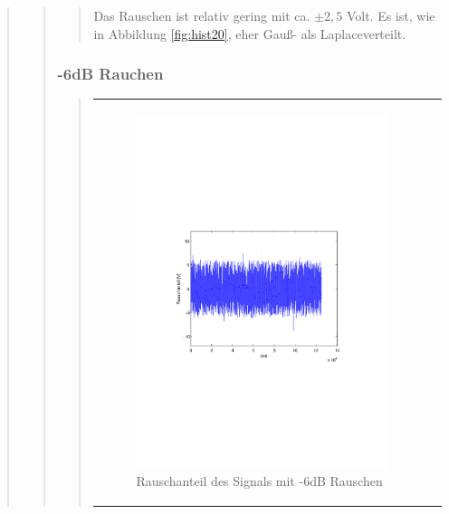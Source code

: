 \begin{quote}
\begin{quote}
\begin{quote}
            Das Rauschen ist relativ gering mit ca. $ \pm2,5$ Volt. Es ist, wie in Abbildung \ref{fig:hist20}, eher Gauß- als
            Laplaceverteilt.
            
        \end{quote}
        
        
        \subsubsection{-6dB Rauchen}
        \begin{quote}
        \begin{center}
        \begin{tabular}{ll}
        
        \hspace{-16.5em}
            \begin{minipage}{0.6\textwidth}
                
                \begin{figure}[H]
                    \label{fig:funktion0alpha}
                    \includegraphics[scale=0.7, trim = 20mm 80mm 20mm 90mm, clip]{Bilder/rau6}
                    \caption{Rauschanteil des Signals mit -6dB Rauschen}
                \end{figure}
                

\end{minipage}
\end{tabular}
\end{center}
\end{quote}
\end{quote}
\end{quote}
